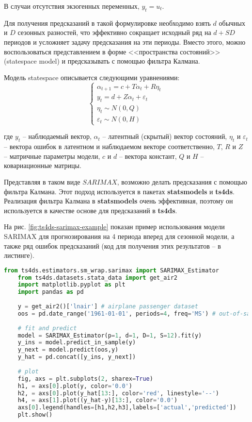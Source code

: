 \documentclass[a4paper,14pt]{extreport}
\begin{document}
	В случаи отсутствия экзогенных переменных, $y_t = u_t$.
	
	Для получения предсказаний в такой формулировке необходимо взять $d$ обычных и $D$ сезонных разностей, что эффективно сокращает исходный ряд на $d+SD$ периодов и усложняет задачу предсказания на эти периоды. Вместо этого, можно воспользоваться представлением в форме <<пространства состояний>> (statespace model) и предсказывать с помощью фильтра Калмана.
	
	Модель statespace описывается следующими уравнениями:
	\begin{equation}
	\begin{cases}
	\alpha_{t+1} = c + T \alpha_t + R \eta_t \\
	y_t = d + Z \alpha_t + \varepsilon_t \\
	\eta_{t} \sim N(0, Q) \\
	\varepsilon_t \sim N(0, H)
	\end{cases} 
	\label{eq:sarimax_statespace}
	\end{equation}
	
	где $y_t$ -- наблюдаемый вектор, $\alpha_t$ -- латентный (скрытый) вектор состояний, $\eta_t$ и $\varepsilon_t$ -- вектора ошибок в латентном и наблюдаемом векторе соответственно,
	$T$, $R$ и $Z$ -- матричные параметры модели, $c$ и $d$ -- вектора констант, $Q$ и $H$ -- ковариационные матрицы.
	
	Представляя в таком виде $SARIMAX$, возможно делать предсказания с помощью фильтра Калмана. Этот подход используется в пакетах \textbf{statsmodels}\cite{fulton_statespace} и \textbf{ts4ds}. Реализация фильтра Калмана в \textbf{statsmodels} очень эффективная, поэтому он используется в качестве основе для предсказаний в \textbf{ts4ds}. 
	
	На рис. \ref{fig:ts4ds-sarimax-example} показан пример использования модели SARIMAX для прогнозирования на 4 периода вперед для сезонной модели, а также ряд ошибок предсказаний (код для получения этих результатов -- в листинге).
	
	\begin{lstlisting}[language=Python]
	from ts4ds.estimators.sm_wrap.sarimax import SARIMAX_Estimator
	from ts4ds.datasets.stata_data import get_air2
	import matplotlib.pyplot as plt
	import pandas as pd
	
	y = get_air2()['lnair'] # airplane passenger dataset
	oos = pd.date_range('1961-01-01', periods=4, freq='MS') # out-of-sample
	
	# fit and predict
	model = SARIMAX_Estimator(p=1, d=1, D=1, S=12).fit(y)
	y_ins = model.predict_in_sample(y)
	y_next = model.predict(oos,y)
	y_hat = pd.concat([y_ins, y_next])
	
	# plot
	fig, axs = plt.subplots(2, sharex=True)
	h1, = axs[0].plot(y, color='0.0')
	h2, = axs[0].plot(y_hat[13:], color='red', linestyle='--')
	h4, = axs[1].plot((y_hat-y)[13:], color='0.0')
	axs[0].legend(handles=[h1,h2,h3],labels=['actual','predicted'])
	plt.show()
	\end{lstlisting}
	
\end{document}
